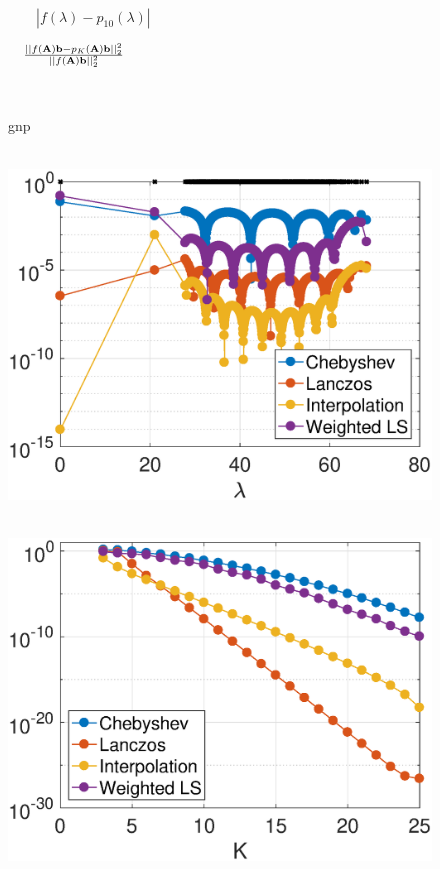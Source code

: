 \documentclass{article}
\begin{document}
\begin{figure}[bth] 
\begin{minipage}[m]{0.1\linewidth}
~
\end{minipage}
\begin{minipage}[m]{0.44\linewidth}
\centerline{\small{~~~~$|f(\lambda)-p_{10}(\lambda)|$}}
\end{minipage}
\hspace{.01\linewidth}
\begin{minipage}[m]{0.42\linewidth}
\centerline{\small{~~$\frac{||f({\bf A}){\bf b}-p_K({\bf A}){\bf b}||_2^2}{||f({\bf A}){\bf b}||_2^2}$}}
\end{minipage}\\
\begin{minipage}[m]{0.1\linewidth}
\centerline{\small{gnp}}
\end{minipage}
\begin{minipage}[m]{0.44\linewidth}
\centerline{~~\includegraphics[width=.95\linewidth]{fig_gnp_deg10}}
\end{minipage}
\begin{minipage}[m]{0.44\linewidth}
\centerline{~~\includegraphics[width=.95\linewidth]{fig_gnp_err_const_b}}

\end{minipage}
\end{figure}
\end{document}

